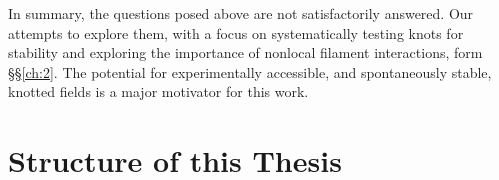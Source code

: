 In summary, the questions posed above are not satisfactorily answered. Our attempts to explore them, with a focus on systematically testing knots for stability and exploring the importance of nonlocal filament interactions, form \S\S \ref{ch:2}. The potential for experimentally accessible, and spontaneously stable, knotted fields is a major motivator for this work.


\section{Structure of this Thesis}

